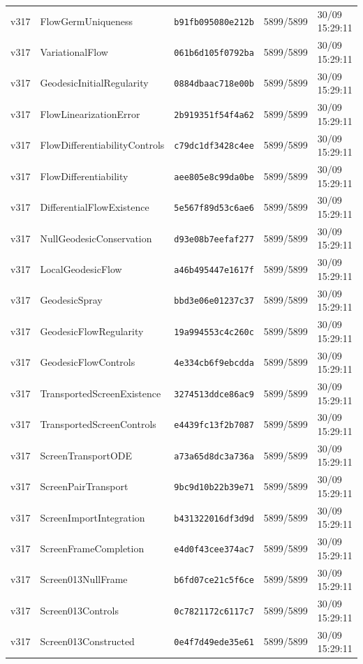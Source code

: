 \documentclass[11pt]{article}
\theoremstyle{definition}\newtheorem{deriv}{Derivação}
\begin{document}
{\begin{longtable}{@{}lllll@{}}
v317 & FlowGermUniqueness & \texttt{b91fb095080e212b} & 5899/5899 & 30/09 15:29:11 \\
v317 & VariationalFlow & \texttt{061b6d105f0792ba} & 5899/5899 & 30/09 15:29:11 \\
v317 & GeodesicInitialRegularity & \texttt{0884dbaac718e00b} & 5899/5899 & 30/09 15:29:11 \\
v317 & FlowLinearizationError & \texttt{2b919351f54f4a62} & 5899/5899 & 30/09 15:29:11 \\
v317 & FlowDifferentiabilityControls & \texttt{c79dc1df3428c4ee} & 5899/5899 & 30/09 15:29:11 \\
v317 & FlowDifferentiability & \texttt{aee805e8c99da0be} & 5899/5899 & 30/09 15:29:11 \\
v317 & DifferentialFlowExistence & \texttt{5e567f89d53c6ae6} & 5899/5899 & 30/09 15:29:11 \\
v317 & NullGeodesicConservation & \texttt{d93e08b7eefaf277} & 5899/5899 & 30/09 15:29:11 \\
v317 & LocalGeodesicFlow & \texttt{a46b495447e1617f} & 5899/5899 & 30/09 15:29:11 \\
v317 & GeodesicSpray & \texttt{bbd3e06e01237c37} & 5899/5899 & 30/09 15:29:11 \\
v317 & GeodesicFlowRegularity & \texttt{19a994553c4c260c} & 5899/5899 & 30/09 15:29:11 \\
v317 & GeodesicFlowControls & \texttt{4e334cb6f9ebcdda} & 5899/5899 & 30/09 15:29:11 \\
v317 & TransportedScreenExistence & \texttt{3274513ddce86ac9} & 5899/5899 & 30/09 15:29:11 \\
v317 & TransportedScreenControls & \texttt{e4439fc13f2b7087} & 5899/5899 & 30/09 15:29:11 \\
v317 & ScreenTransportODE & \texttt{a73a65d8dc3a736a} & 5899/5899 & 30/09 15:29:11 \\
v317 & ScreenPairTransport & \texttt{9bc9d10b22b39e71} & 5899/5899 & 30/09 15:29:11 \\
v317 & ScreenImportIntegration & \texttt{b431322016df3d9d} & 5899/5899 & 30/09 15:29:11 \\
v317 & ScreenFrameCompletion & \texttt{e4d0f43cee374ac7} & 5899/5899 & 30/09 15:29:11 \\
v317 & Screen013NullFrame & \texttt{b6fd07ce21c5f6ce} & 5899/5899 & 30/09 15:29:11 \\
v317 & Screen013Controls & \texttt{0c7821172c6117c7} & 5899/5899 & 30/09 15:29:11 \\
v317 & Screen013Constructed & \texttt{0e4f7d49ede35e61} & 5899/5899 & 30/09 15:29:11 \\

\end{longtable}}
\end{document}
